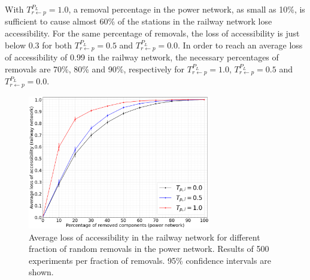 \documentclass[review]{elsarticle}
\begin{document}
	With $T_{r \leftarrow p}^{P_L}=1.0$, a removal percentage in the power network, as small as 10\%,  is sufficient to cause almost 60\% of the stations in the railway network lose accessibility. For the same percentage of removals, the loss of accessibility is just below 0.3 for both $T_{r \leftarrow p}^{P_L}=0.5$ and $T_{r \leftarrow p}^{P_L}=0.0$. In order to reach an average loss of accessibility of 0.99 in the railway network, the necessary percentages of removals are 70\%, 80\% and 90\%, respectively for $T_{r \leftarrow p}^{P_L}=1.0$, $T_{r \leftarrow p}^{P_L}=0.5$ and $T_{r \leftarrow p}^{P_L}=0.0$. 
		\begin{figure}[ht]
	\centering
	\includegraphics[width=8cm]{images/vuln_conn_power_to_rail.png}
	\caption{Average loss of accessibility in the railway network for different fraction of random removals in the power network. Results of 500 experiments per fraction of removals. 95\% confidence intervals are shown.}
	\label{vuln_power_to_rail}
\end{figure}
\end{document}
